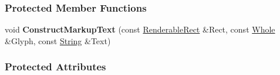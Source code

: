 \subsubsection*{Protected Member Functions}
\begin{DoxyCompactItemize}
\item 
\hypertarget{classphys_1_1UI_1_1MarkupText_a8c82cd91573f7bdd9687500ee5aa2a3c}{
void {\bfseries ConstructMarkupText} (const \hyperlink{structphys_1_1UI_1_1RenderableRect}{RenderableRect} \&Rect, const \hyperlink{namespacephys_a460f6bc24c8dd347b05e0366ae34f34a}{Whole} \&Glyph, const \hyperlink{namespacephys_aa03900411993de7fbfec4789bc1d392e}{String} \&Text)}
\label{classphys_1_1UI_1_1MarkupText_a8c82cd91573f7bdd9687500ee5aa2a3c}

\end{DoxyCompactItemize}
\subsubsection*{Protected Attributes}
